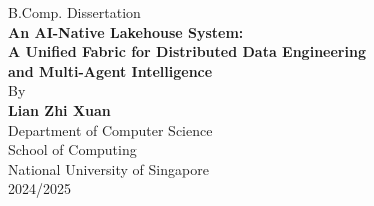\documentclass[12pt, a4paper]{report}
\begin{document}

\pagestyle{empty}

\begin{titlepage}
  \begin{center}
    \vspace*{1cm}
    {\large B.Comp. Dissertation}\\[2cm]

    {\LARGE\bfseries An AI-Native Lakehouse System: \\[0.5em]
      A Unified Fabric for Distributed Data Engineering \\[0.3em]
      and Multi-Agent Intelligence}\\[2.5cm]

    {\large By}\\[0.5cm]
    {\large\bfseries Lian Zhi Xuan}\\[2cm]


    {\large Department of Computer Science}\\[0.2cm]
    {\large School of Computing}\\[0.2cm]
    {\large National University of Singapore}\\[1.5cm]

    {\large 2024/2025}
  \end{center}
\end{titlepage}
\end{document}
